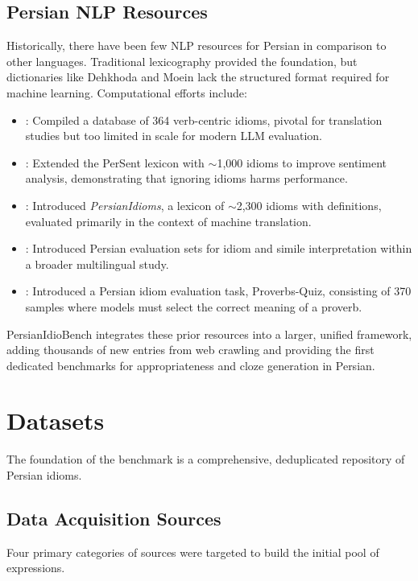 \documentclass[11pt,a4paper]{article}
\begin{document}
\subsection{Persian NLP Resources}
Historically, there have been few NLP resources for Persian in comparison to other languages. Traditional lexicography provided the foundation, but dictionaries like Dehkhoda and Moein lack the structured format required for machine learning. Computational efforts include:
\begin{itemize}
    \item \citet{ostovar2014persianidioms}: Compiled a database of 364 verb-centric idioms, pivotal for translation studies but too limited in scale for modern LLM evaluation.
    \item \citet{dashtipour2022extending}: Extended the PerSent lexicon with $\sim$1,000 idioms to improve sentiment analysis, demonstrating that ignoring idioms harms performance.
    \item \citet{rezaeimanesh2025largelanguagemodelspersian}: Introduced \textit{PersianIdioms}, a lexicon of $\sim$2,300 idioms with definitions, evaluated primarily in the context of machine translation.
        \item \citet{khoshtab2025multilingualidioms}: Introduced Persian evaluation sets for idiom and simile interpretation within a broader multilingual study.
    \item \citet{farsi2025melac}: Introduced a Persian idiom evaluation task, Proverbs-Quiz, consisting of 370 samples where models must select the correct meaning of a proverb.
\end{itemize}
PersianIdioBench integrates these prior resources into a larger, unified framework, adding thousands of new entries from web crawling and providing the first dedicated benchmarks for appropriateness and cloze generation in Persian.

\section{Datasets}
The foundation of the benchmark is a comprehensive, deduplicated repository of Persian idioms.

\subsection{Data Acquisition Sources}
Four primary categories of sources were targeted to build the initial pool of expressions.
\end{document}
